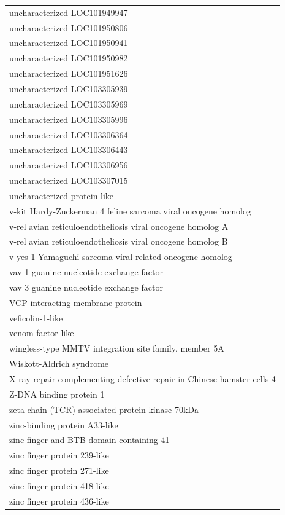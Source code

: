 \documentclass[english]{article}\usepackage[]{graphicx}\usepackage[]{color}
\begin{document}
\begin{longtable}{l}
uncharacterized LOC101949947 \\ 
uncharacterized LOC101950806 \\ 
uncharacterized LOC101950941 \\ 
uncharacterized LOC101950982 \\ 
uncharacterized LOC101951626 \\ 
uncharacterized LOC103305939 \\ 
uncharacterized LOC103305969 \\ 
uncharacterized LOC103305996 \\ 
uncharacterized LOC103306364 \\ 
uncharacterized LOC103306443 \\ 
uncharacterized LOC103306956 \\ 
uncharacterized LOC103307015 \\ 
uncharacterized protein-like \\ 
v-kit Hardy-Zuckerman 4 feline sarcoma viral oncogene homolog \\ 
v-rel avian reticuloendotheliosis viral oncogene homolog A \\ 
v-rel avian reticuloendotheliosis viral oncogene homolog B \\ 
v-yes-1 Yamaguchi sarcoma viral related oncogene homolog \\ 
vav 1 guanine nucleotide exchange factor \\ 
vav 3 guanine nucleotide exchange factor \\ 
VCP-interacting membrane protein \\ 
veficolin-1-like \\ 
venom factor-like \\ 
wingless-type MMTV integration site family, member 5A \\ 
Wiskott-Aldrich syndrome \\ 
X-ray repair complementing defective repair in Chinese hamster cells 4 \\ 
Z-DNA binding protein 1 \\ 
zeta-chain (TCR) associated protein kinase 70kDa \\ 
zinc-binding protein A33-like \\ 
zinc finger and BTB domain containing 41 \\ 
zinc finger protein 239-like \\ 
zinc finger protein 271-like \\ 
zinc finger protein 418-like \\ 
zinc finger protein 436-like \\ 

\end{longtable}
\end{document}
